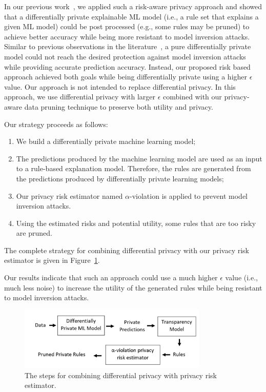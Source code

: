\documentclass{article}
\begin{document}
In our previous work~\cite{yasmeen-tdsc}, we applied such a risk-aware privacy approach and showed that a differentially private explainable ML model (i.e., a rule set that explains a given ML model) could be post processed (e.g., some rules may be pruned) to achieve better accuracy while being more resistant to model inversion attacks. Similar to previous observations in the literature~\cite{Fredrikson:2015}, a pure differentially private model could not reach the desired protection against model inversion attacks while providing accurate prediction accuracy. Instead, our proposed risk based approach achieved both goals while being differentially private using a higher $\epsilon$ value. Our approach is not intended to replace differential privacy. In this approach, we use differential privacy with larger $\epsilon$ combined with our privacy-aware data pruning technique to preserve both utility and privacy. 

Our strategy proceeds as follows:
\begin{enumerate}
\item We build a differentially private machine learning model;
\item The predictions produced by the machine learning model are used as an input to a rule-based explanation model. Therefore, the rules are generated from the predictions produced by differentially private learning models; 
\item Our privacy risk estimator named $\alpha$-violation is applied to prevent  model inversion attacks.
\item Using the estimated risks and potential utility, some rules that are too risky are pruned.
\end{enumerate}
The complete strategy for combining differential privacy  with our privacy risk estimator is given in Figure~\ref{fig:DP_alpha}.

Our results indicate that such an approach could use a much higher $\epsilon$ value (i.e., much less noise) to increase the utility of the generated rules while being resistant to model inversion attacks.

\begin{figure}[!htb]
 \centering
\includegraphics[height=3cm]{letters/PPModel.PNG}
 \caption{The steps for combining differential privacy  with privacy risk estimator.}
 \label{fig:DP_alpha}
\end{figure}
\end{document}
